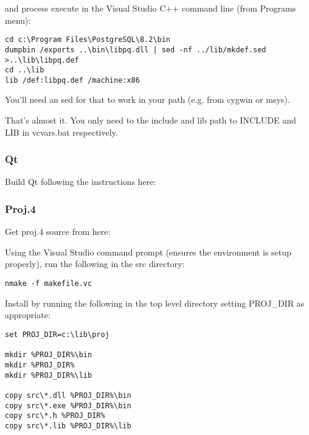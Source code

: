 and process execute in the Visual Studio C++ command line (from Programs menu):

\begin{verbatim}
cd c:\Program Files\PostgreSQL\8.2\bin
dumpbin /exports ..\bin\libpq.dll | sed -nf ../lib/mkdef.sed >..\lib\libpq.def
cd ..\lib
lib /def:libpq.def /machine:x86
\end{verbatim}

You'll need an sed for that to work in your path (e.g. from cygwin or msys).

That's almost it.  You only need to the include and lib path to INCLUDE and LIB
in vcvars.bat respectively.

\subsubsection{Qt}
Build Qt following the instructions here:

	\begin{quotation}
	\end{quotation}

\subsubsection{Proj.4}
Get proj.4 source from here:

	\begin{quotation}
	\end{quotation}
Using the Visual Studio command prompt (ensures the environment is setup properly), run the following in the src directory:

\begin{verbatim}
nmake -f makefile.vc
\end{verbatim}

Install by running the following in the top level directory setting PROJ\_DIR as appropriate:

\begin{verbatim}
set PROJ_DIR=c:\lib\proj

mkdir %PROJ_DIR%\bin
mkdir %PROJ_DIR%
mkdir %PROJ_DIR%\lib

copy src\*.dll %PROJ_DIR%\bin
copy src\*.exe %PROJ_DIR%\bin
copy src\*.h %PROJ_DIR%
copy src\*.lib %PROJ_DIR%\lib 
\end{verbatim}

